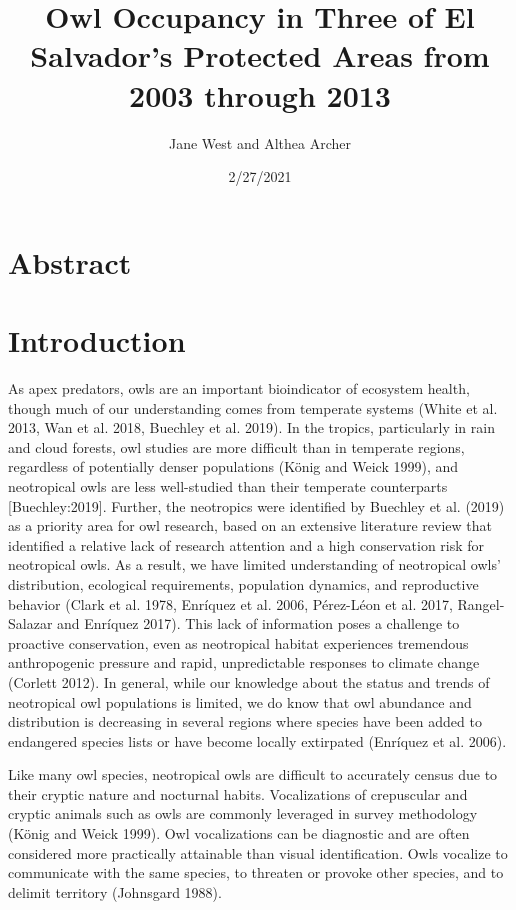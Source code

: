 \documentclass[
]{article}
\title{Owl Occupancy in Three of El Salvador's Protected Areas from 2003
through 2013}
\author{Jane West and Althea Archer}
\date{2/27/2021}
\begin{document}
\maketitle

\hypertarget{abstract}{%
\section{Abstract}\label{abstract}}

\hypertarget{introduction}{%
\section{Introduction}\label{introduction}}

As apex predators, owls are an important bioindicator of ecosystem
health, though much of our understanding comes from temperate systems
(White et al. 2013, Wan et al. 2018, Buechley et al. 2019). In the
tropics, particularly in rain and cloud forests, owl studies are more
difficult than in temperate regions, regardless of potentially denser
populations (König and Weick 1999), and neotropical owls are less
well-studied than their temperate counterparts {[}Buechley:2019{]}.
Further, the neotropics were identified by Buechley et al. (2019) as a
priority area for owl research, based on an extensive literature review
that identified a relative lack of research attention and a high
conservation risk for neotropical owls. As a result, we have limited
understanding of neotropical owls' distribution, ecological
requirements, population dynamics, and reproductive behavior (Clark et
al. 1978, Enríquez et al. 2006, Pérez-Léon et al. 2017, Rangel-Salazar
and Enríquez 2017). This lack of information poses a challenge to
proactive conservation, even as neotropical habitat experiences
tremendous anthropogenic pressure and rapid, unpredictable responses to
climate change (Corlett 2012). In general, while our knowledge about the
status and trends of neotropical owl populations is limited, we do know
that owl abundance and distribution is decreasing in several regions
where species have been added to endangered species lists or have become
locally extirpated (Enríquez et al. 2006).

Like many owl species, neotropical owls are difficult to accurately
census due to their cryptic nature and nocturnal habits. Vocalizations
of crepuscular and cryptic animals such as owls are commonly leveraged
in survey methodology (König and Weick 1999). Owl vocalizations can be
diagnostic and are often considered more practically attainable than
visual identification. Owls vocalize to communicate with the same
species, to threaten or provoke other species, and to delimit territory
(Johnsgard 1988).
\end{document}

